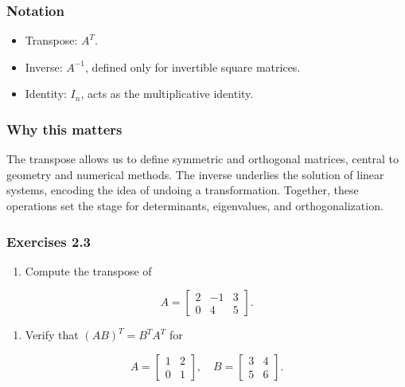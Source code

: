 \documentclass[
  12pt,
  a4paper,
]{article}
\begin{document}
\subsubsection{Notation}\label{notation-6}

\begin{itemize}
\item
  Transpose: \(A^T\).
\item
  Inverse: \(A^{-1}\), defined only for invertible square matrices.
\item
  Identity: \(I_n\), acts as the multiplicative identity.
\end{itemize}

\subsubsection{Why this matters}\label{why-this-matters-6}

The transpose allows us to define symmetric and orthogonal matrices,
central to geometry and numerical methods. The inverse underlies the
solution of linear systems, encoding the idea of undoing a
transformation. Together, these operations set the stage for
determinants, eigenvalues, and orthogonalization.

\subsubsection{Exercises 2.3}\label{exercises-23}

\begin{enumerate}
\def\labelenumi{\arabic{enumi}.}
\item
  Compute the transpose of
\end{enumerate}

\[A = \begin{bmatrix} 2 & -1 & 3 \\ 0 & 4 & 5 \end{bmatrix}.\]

\begin{enumerate}
\def\labelenumi{\arabic{enumi}.}
\item
  Verify that \((AB)^T = B^T A^T\) for
\end{enumerate}

\[A = \begin{bmatrix} 1 & 2 \\ 0 & 1 \end{bmatrix}, \quad
B = \begin{bmatrix} 3 & 4 \\ 5 & 6 \end{bmatrix}.\]
\end{document}
